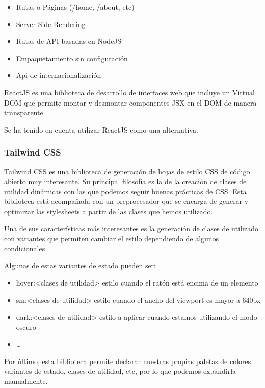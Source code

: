 \begin{itemize}
\itemsep0em 
\item
  Rutas o Páginas (/home, /about, etc)
\item
  Server Side Rendering
\item
  Rutas de API basadas en NodeJS
\item
  Empaquetamiento sin configuración
\item
  Api de internacionalización
\end{itemize}

ReactJS es una biblioteca de desarrollo de interfaces web que incluye un
Virtual DOM que permite montar y desmontar componentes JSX en el DOM de
manera transparente.

Se ha tenido en cuenta utilizar ReactJS como una alternativa.

\hypertarget{tailwind-css}{%
\subsubsection{\texorpdfstring{Tailwind CSS
}{Tailwind CSS }}\label{tailwind-css}}

Tailwind CSS es una biblioteca de generación de hojas de estilo CSS de
código abierto muy interesante. Su principal filosofía es la de la
creación de clases de utilidad dinámicas con las que podemos seguir
buenas prácticas de CSS. Esta biblioteca está acompañada con un
preprocesador que se encarga de generar y optimizar las stylesheets a
partir de las clases que hemos utilizado.

Una de sus características más interesantes es la generación de clases
de utilizado con variantes que permiten cambiar el estilo dependiendo de
algunos condicionales

Algunas de estas variantes de estado pueden ser:

\begin{itemize}
\itemsep0em 
\item
  hover:\textless clases de utilidad\textgreater{} estilo cuando el
  ratón está encima de un elemento
\item
  sm:\textless clases de utilidad\textgreater{} estilo cuando el ancho
  del viewport es mayor a 640px
\item
  dark:\textless clases de utilidad\textgreater{} estilo a aplicar
  cuando estamos utilizando el modo oscuro
\item
  \ldots{}
\end{itemize}

Por último, esta biblioteca permite declarar nuestras propias paletas de
colores, variantes de estado, clases de utilidad, etc, por lo que
podemos expandirla manualmente.


